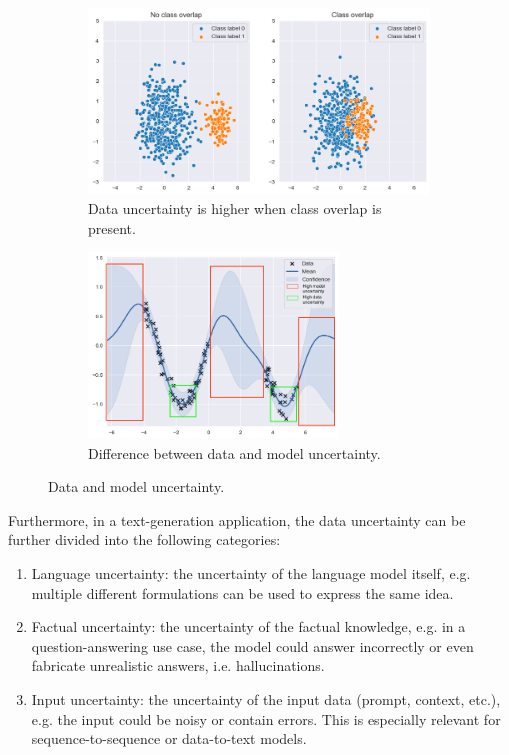 \begin{figure}
     \centering
     \begin{subfigure}[b]{0.49\textwidth}
         \centering
         \includegraphics[width=\textwidth, height=140pt]{figures/related_work/classoverlap.png}
         \caption{Data uncertainty is higher when class overlap is present.}
     \end{subfigure}
     \hfill
     \begin{subfigure}[b]{0.49\textwidth}
         \centering
         \includegraphics[width=\textwidth,height=140pt]{figures/related_work/gp.png}
         \caption{Difference between data and model uncertainty.}
     \end{subfigure}
     \caption{Data and model uncertainty.}
     \label{fig:data-mode-uncertainty-illustration}
\end{figure}




Furthermore, in a text-generation application, the data uncertainty can be further divided into the following categories:
\begin{enumerate}
    \item Language uncertainty: the uncertainty of the language model itself, e.g. multiple different formulations can be used to express the same idea.
    \item Factual uncertainty: the uncertainty of the factual knowledge, e.g. in a question-answering use case, the model could answer incorrectly or even fabricate unrealistic answers, i.e. hallucinations.
    \item Input uncertainty: the uncertainty of the input data (prompt, context, etc.), e.g. the input could be noisy or contain errors. This is especially relevant for sequence-to-sequence or data-to-text models.
\end{enumerate}

